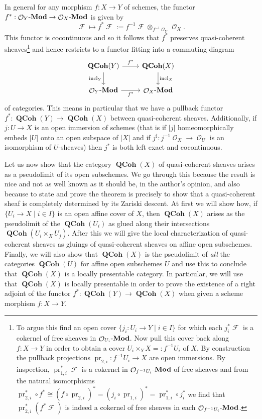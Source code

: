 \documentclass{amsart}
\theoremstyle{definition}
\DeclareMathOperator{\Fscr}{\mathscr{F}}
\DeclareMathOperator{\Ocal}{\mathcal{O}}
\DeclareMathOperator{\QCoh}{\mathbf{QCoh}}
\DeclareMathOperator{\pr}{pr}
\newcommand{\Mod}[1]{{#1}\textnormal{-}\mathbf{Mod}}
\numberwithin{equation}{subsection}
\begin{document}
In general for any morphism $f:X \to Y$ of schemes, the functor $f^{\ast}:\Mod{\Ocal_Y} \to \Mod{\Ocal_X}$ is given by 
\[
\Fscr \mapsto f^{\ast}\Fscr := f^{-1}\Fscr \otimes_{f^{-1}\Ocal_Y} \Ocal_X.
\]
This functor is cocontinuous and so it follows that $f^{\ast}$ preserves quasi-coherent sheaves\footnote{To argue this find an open cover $\lbrace j_i:U_i \to Y \; | \; i \in I \rbrace$ for which each $j_i^{\ast}\Fscr$ is a cokernel of free sheaves in $\Mod{\Ocal_{U_i}}$. Now pull this cover back along $f:X \to Y$ in order to obtain a cover $U_i \times_Y X =: f^{-1}U_i$ of $X$. By construction the pullback projections $\pr_{2,i}:f^{-1}U_i \to X$ are open immersions. By inspection, $\pr_{1,i}^{\ast}\Fscr$ is a cokernel in $\Mod{\Ocal_{f^{-1}U_i}}$ of free sheaves and from the natural isomorphisms $\pr_{2,i}^{\ast} \circ f^{\ast} \cong (f \circ \pr_{2,i})^{\ast} = (j_i \circ \pr_{1,i})^{\ast} = \pr_{1,i}^{\ast} \circ j_i^{\ast}$ we find that $\pr_{2,i}^{\ast}(f^{\ast}\Fscr)$ is indeed a cokernel of free sheaves in each $\Mod{\Ocal_{f^{-1}U_i}}$.}  and hence restricts to a functor fitting into a commuting diagram
\[
\begin{tikzcd}
\QCoh(Y) \ar[r]{}{f^{\ast}} \ar[d, swap]{}{\operatorname{incl}_Y} & \QCoh(X) \ar[d]{}{\operatorname{incl}_X} \\
\Mod{\Ocal_Y} \ar[r, swap]{}{f^{\ast}} & \Mod{\Ocal_X}
\end{tikzcd}
\]
of categories. This means in particular that we have a pullback functor $f^{\ast}:\QCoh(Y) \to \QCoh(X)$ between quasi-coherent sheaves. Additionally, if $j:U \to X$ is an open immersion of schemes (that is if $\lvert j \rvert$ homeomorphically embeds $\lvert U\rvert$ onto an open subspace of $\lvert X \rvert$ and if $j^{\sharp}:j^{-1}\Ocal_X \to \Ocal_U$ is an isomorphism of $U$-sheaves) then $j^{\ast}$ is both left exact and cocontinuous.

Let us now show that the category $\QCoh(X)$ of quasi-coherent sheaves arises as a pseudolimit of its open subschemes. We go through this because the result is nice and not as well known as it should be, in the author's opinion, and also because to state and prove the theorem is precisely to show that a quasi-coherent sheaf is completely determined by its Zariski descent. At first we will show how, if $\lbrace U_i \to X \; | \; i \in I \rbrace$ is an open affine cover of $X$, then $\QCoh(X)$ arises as the pseudolimit of the $\QCoh(U_i)$ as glued along their intersections $\QCoh(U_i \times_X U_j)$. After this we will give the local characterization of quasi-coherent sheaves as gluings of quasi-coherent sheaves on affine open subschemes. Finally, we will also show that $\QCoh(X)$ is the pseudolimit of \emph{all} the categories $\QCoh(U)$ for affine open subschemes $U$ and use this to conclude that $\QCoh(X)$ is a locally presentable category. In particular, we will use that $\QCoh(X)$ is locally presentable in order to prove the existence of a right adjoint of the functor $f^{\ast}:\QCoh(Y) \to \QCoh(X)$ when given a scheme morphism $f:X \to Y$.
\end{document}
